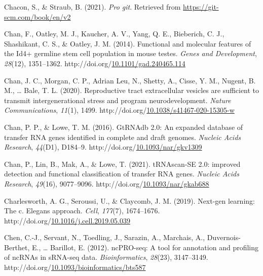 \documentclass[12pt,twoside]{reedthesis}
\newlength{\cslhangindent}
\newenvironment{CSLReferences}[2] %
 {%
  \setlength{\parindent}{0pt}
  \ifodd #1 \everypar{\setlength{\hangindent}{\cslhangindent}}\ignorespaces\fi
  \ifnum #2 > 0
  \setlength{\parskip}{#2\baselineskip}
  \fi
 }%
 {}
\begin{document}
\begin{CSLReferences}{1}{0}
\leavevmode{}%
Chacon, S., \& Straub, B. (2021). \emph{Pro git}. Retrieved from \url{https://git-scm.com/book/en/v2}

\leavevmode{}%
Chan, F., Oatley, M. J., Kaucher, A. V., Yang, Q. E., Bieberich, C. J., Shashikant, C. S., \& Oatley, J. M. (2014). Functional and molecular features of the Id4+ germline stem cell population in mouse testes. \emph{Genes and Development}, \emph{28}(12), 1351--1362. http://doi.org/\href{https://doi.org/10.1101/gad.240465.114}{10.1101/gad.240465.114}

\leavevmode{}%
Chan, J. C., Morgan, C. P., Adrian Leu, N., Shetty, A., Cisse, Y. M., Nugent, B. M., \ldots{} Bale, T. L. (2020). Reproductive tract extracellular vesicles are sufficient to transmit intergenerational stress and program neurodevelopment. \emph{Nature Communications}, \emph{11}(1), 1499. http://doi.org/\href{https://doi.org/10.1038/s41467-020-15305-w}{10.1038/s41467-020-15305-w}

\leavevmode{}%
Chan, P. P., \& Lowe, T. M. (2016). GtRNAdb 2.0: An expanded database of transfer RNA genes identified in complete and draft genomes. \emph{Nucleic Acids Research}, \emph{44}(D1), D184--9. http://doi.org/\href{https://doi.org/10.1093/nar/gkv1309}{10.1093/nar/gkv1309}

\leavevmode{}%
Chan, P., Lin, B., Mak, A., \& Lowe, T. (2021). tRNAscan-SE 2.0: improved detection and functional classification of transfer RNA genes. \emph{Nucleic Acids Research}, \emph{49}(16), 9077--9096. http://doi.org/\href{https://doi.org/10.1093/nar/gkab688}{10.1093/nar/gkab688}

\leavevmode{}%
Charlesworth, A. G., Seroussi, U., \& Claycomb, J. M. (2019). Next-gen learning: The c. Elegans approach. \emph{Cell}, \emph{177}(7), 1674--1676. http://doi.org/\href{https://doi.org/10.1016/j.cell.2019.05.039}{10.1016/j.cell.2019.05.039}

\leavevmode{}%
Chen, C.-J., Servant, N., Toedling, J., Sarazin, A., Marchais, A., Duvernois-Berthet, E., \ldots{} Barillot, E. (2012). ncPRO-seq: A tool for annotation and profiling of ncRNAs in sRNA-seq data. \emph{Bioinformatics}, \emph{28}(23), 3147--3149. http://doi.org/\href{https://doi.org/10.1093/bioinformatics/bts587}{10.1093/bioinformatics/bts587}


\end{CSLReferences}
\end{document}

